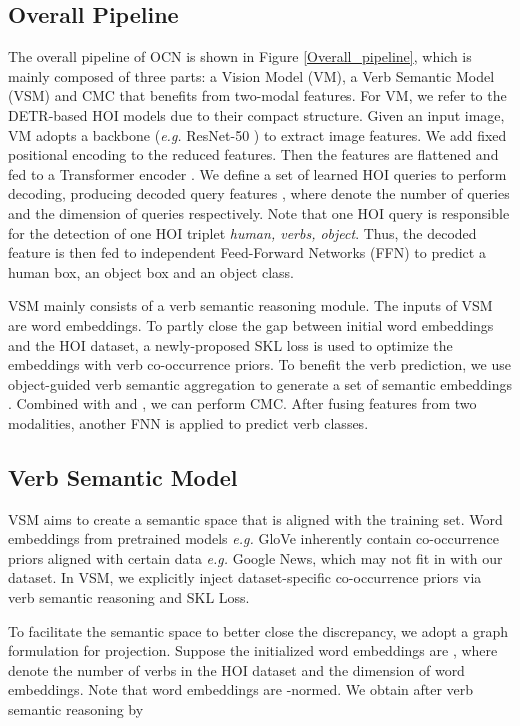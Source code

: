 \documentclass[letterpaper]{article} \usepackage{aaai22}  \usepackage{times}  \usepackage{helvet}  \usepackage{courier}  \usepackage[hyphens]{url}  \usepackage{graphicx} \urlstyle{rm} \def\UrlFont{\rm}  \usepackage{natbib}  \usepackage{caption} \DeclareCaptionStyle{ruled}{labelfont=normalfont,labelsep=colon,strut=off} \frenchspacing  \setlength{\pdfpagewidth}{8.5in}  \setlength{\pdfpageheight}{11in}  \usepackage{algorithm}
\begin{document}
\subsection{Overall Pipeline}
The overall pipeline of OCN is shown in Figure \ref{Overall_pipeline}, which is mainly composed of three parts: a Vision Model (VM), a Verb Semantic Model (VSM) and CMC that benefits from two-modal features. For VM, we refer to the DETR-based HOI models \cite{zou2021HOITransformer,tamura2021qpic} due to their compact structure. Given an input image, VM adopts a backbone (\textit{e.g.} ResNet-50 \cite{he2016resnet}) to extract image features. We add fixed positional encoding \cite{gehring2017SeqtoSeq} to the reduced features. Then the features are flattened and fed to a Transformer encoder \cite{AttentionAlluNeed}. We define a set of learned HOI queries  to perform decoding, producing decoded query features , where  denote the number of queries and the dimension of queries respectively. Note that one HOI query is responsible for the detection of one HOI triplet \textit{human, verbs, object}. Thus, the decoded feature  is then fed to independent Feed-Forward Networks (FFN) to predict a human box, an object box and an object class. 

VSM mainly consists of a verb semantic reasoning module. The inputs of VSM are word embeddings. To partly close the gap between initial word embeddings and the HOI dataset, a newly-proposed SKL loss is used to optimize the embeddings with verb co-occurrence priors. To benefit the verb prediction, we use object-guided verb semantic aggregation to generate a set of semantic embeddings . Combined with  and , we can perform CMC. After fusing features from two modalities, another FNN is applied to predict verb classes.



\subsection{Verb Semantic Model}
VSM aims to create a semantic space that is aligned with the training set. Word embeddings from pretrained models \textit{e.g.} GloVe \cite{pennington2014glove} inherently contain co-occurrence priors aligned with certain data \textit{e.g.} Google News, which may not fit in with our dataset. In VSM, we explicitly inject dataset-specific co-occurrence priors via verb semantic reasoning and SKL Loss.

To facilitate the semantic space to better close the discrepancy, we adopt a graph formulation for projection. Suppose the initialized word embeddings are , where  denote the number of verbs in the HOI dataset and the dimension of word embeddings. Note that word embeddings are -normed. We obtain  after verb semantic reasoning by 
\end{document}
